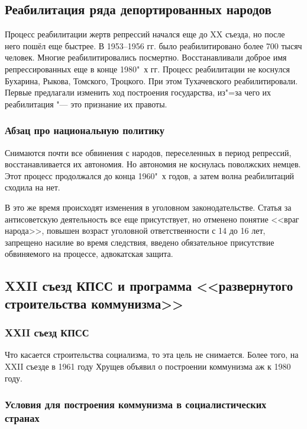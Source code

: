 \subsection{Реабилитация ряда депортированных народов}

Процесс реабилитации жертв репрессий начался еще до XX съезда, но после него пошёл еще быстрее. В 1953--1956 гг.  было реабилитировано более 700 тысяч человек. Многие реабилитировались посмертно. Восстанавливали доброе имя репрессированных еще в конце 1980"~х гг. Процесс реабилитации не коснулся Бухарина, Рыкова, Томского, Троцкого. При этом Тухачевского реабилитировали. Первые предлагали изменить ход построения государства, из"=за чего их реабилитация "--- это признание их правоты. 

\subsubsection{\textbf{Абзац про национальную политику}}
Снимаются почти все обвинения с народов, переселенных в период репрессий, восстанавливается их автономия. Но автономия не коснулась поволжских немцев. Этот процесс продолжался до конца 1960"~х годов, а затем волна реабилитаций сходила на нет.

В это же время происходят изменения в уголовном законодательстве. Статья за антисоветскую деятельность все еще присутствует, но отменено понятие <<враг народа>>, повышен возраст уголовной ответственности с 14 до 16 лет, запрещено насилие во время следствия, введено обязательное присутствие обвиняемого на процессе, адвокатская защита.

\subsection{XXII съезд КПСС и программа <<развернутого строительства коммунизма>>}

\subsubsection{\textbf{XXII съезд КПСС}}

Что касается строительства социализма, то эта цель не снимается. Более того, на XXII съезде в 1961 году Хрущев объявил о построении коммунизма аж к 1980 году. 

\subsubsection{\textbf{Условия для построения коммунизма в социалистических странах}}

